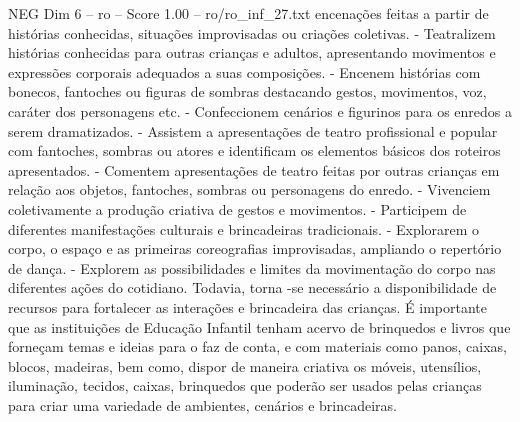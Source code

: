 \begin{textsample}{NEG Dim 6 – ro – Score 1.00 – ro/ro\_inf\_27.txt}
encenações feitas a partir de histórias conhecidas, situações improvisadas ou criações coletivas. - Teatralizem histórias conhecidas para outras crianças e adultos, apresentando movimentos e expressões corporais adequados a suas composições. - Encenem histórias com bonecos, fantoches ou figuras de sombras destacando gestos, movimentos, voz, caráter dos personagens etc. - Confeccionem cenários e figurinos para os enredos a serem dramatizados. - Assistem a apresentações de teatro profissional e popular com fantoches, sombras ou atores e identificam os elementos básicos dos roteiros apresentados. - Comentem apresentações de teatro feitas por outras crianças em relação aos objetos, fantoches, sombras ou personagens do enredo. - Vivenciem coletivamente a produção criativa de gestos e movimentos. - Participem de diferentes manifestações culturais e brincadeiras tradicionais. - Explorarem o corpo, o espaço e as primeiras coreografias improvisadas, ampliando o repertório de dança. - Explorem as possibilidades e limites da movimentação do corpo nas diferentes ações do cotidiano.
Todavia, torna -se necessário a disponibilidade de recursos para fortalecer as interações e brincadeira das crianças.
É importante que as instituições de Educação Infantil tenham acervo de brinquedos e livros que forneçam temas e ideias para o faz de conta, e com materiais como panos, caixas, blocos, madeiras, bem como, dispor de maneira criativa os móveis, utensílios, iluminação, tecidos, caixas, brinquedos que poderão ser usados pelas crianças para criar uma variedade de ambientes, cenários e brincadeiras.

\end{textsample}
